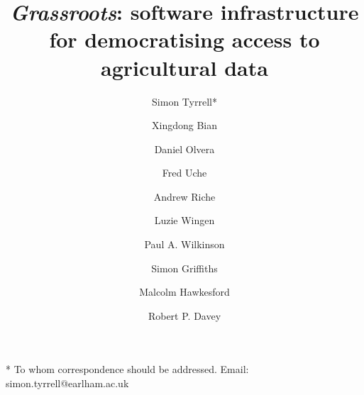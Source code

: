 \documentclass[12pt,a4paper]{extarticle}
\begin{document}
\pagestyle{front}

\title{\textit {Grassroots}: software infrastructure for democratising access to agricultural data}
\author[1]{Simon Tyrrell*}
\author[1]{Xingdong Bian}
\author[1]{Daniel Olvera}
\author[1]{Fred Uche}
\author[3]{Andrew Riche}
\author[4]{Luzie Wingen}
\author[2]{Paul A. Wilkinson}
\author[4]{Simon Griffiths}
\author[3]{Malcolm Hawkesford}
\author[1]{Robert P. Davey}

\maketitle

* To whom correspondence should be addressed. Email: simon.tyrrell@earlham.ac.uk

\thispagestyle{front}

\end{document}
